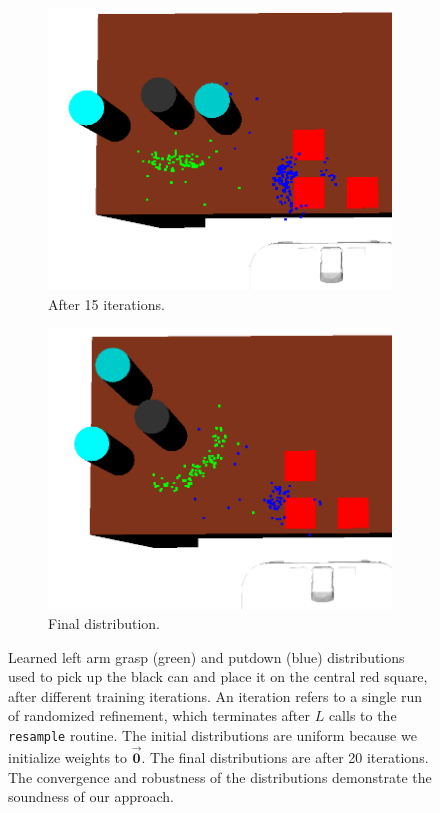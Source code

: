 \begin{figure}
\begin{subfigure}[b]{0.48\linewidth}
  \end{subfigure}
  \begin{subfigure}[b]{0.48\linewidth}
    \includegraphics[width=\textwidth]{images/learn15.png}
    \caption{After 15 iterations.}
  \end{subfigure}
  \begin{subfigure}[b]{0.48\linewidth}
    \includegraphics[width=\textwidth]{images/learn20.png}
    \caption{Final distribution.}
  \end{subfigure}
  \caption{Learned left arm grasp (green) and putdown (blue) distributions used to
pick up the black can and place it on the central red square, after different training iterations.
An iteration refers to a single run of randomized refinement,
which terminates after $L$ calls to the \texttt{resample} routine. The
initial distributions are uniform because we initialize weights to $\vec{\mathbf{0}}$.
The final distributions are after 20 iterations. The convergence and robustness of
the distributions demonstrate the soundness of our approach.}
  \label{fig:training}
\end{figure}

